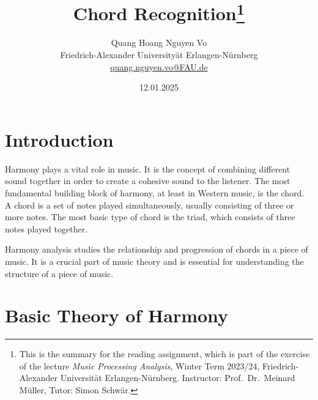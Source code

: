 \documentclass[a4paper, 9pt, twocolumn]{extarticle}
\begin{document}
\date{\normalsize 12.01.2025}

\title{\vspace{-8mm}\textbf{\Large
Chord Recognition\footnote{This is the summary for the reading assignment,
which is part of the exercise of the lecture \emph{Music Processing Analysis}, Winter Term 2023/24,
Friedrich-Alexander Universit\"at Erlangen-N\"urnberg.
Instructor: Prof.\ Dr.\ Meinard M\"uller,
Tutor: Simon Schw\"ar.
}}}

\author{
{
\begin{minipage}{\textwidth}
\center
Quang Hoang Nguyen Vo \\
\small
Friedrich-Alexander University\"at Erlangen-N\"urnberg
\protect\\{} %
\url{quang.nguyen.vo@FAU.de}
\end{minipage}
}
}

\maketitle
\thispagestyle{empty}

\section{Introduction}
\label{section:introduction}

Harmony plays a vital role in music. It is the concept of combining different sound together in order to create a cohesive sound to the listener.\cite{LOMAS20225}
The most fundamental building block of harmony, at least in Western music, is the chord. A chord is a set of notes played simultaneously, usually consisting of three or more notes. The most basic type of chord is the triad, which consists of three notes played together.

Harmony analysis studies the relationship and progression of chords in a piece of music. It is a crucial part of music theory and is essential for understanding the structure of a piece of music.

\section{Basic Theory of Harmony}
\label{section:theory}
\end{document}
